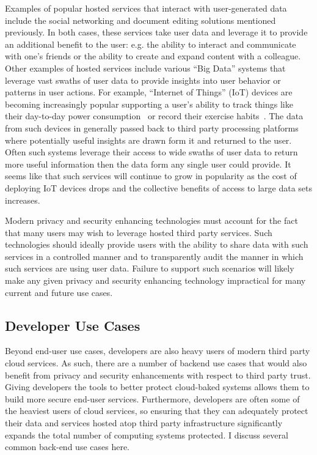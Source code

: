 Examples of popular hosted services that interact with user-generated
data include the social networking and document editing solutions
mentioned previously. In both cases, these services take user data and
leverage it to provide an additional benefit to the user: e.g. the
ability to interact and communicate with one's friends or the ability
to create and expand content with a colleague. Other examples of
hosted services include various ``Big Data'' systems that leverage
vast swaths of user data to provide insights into user behavior or
patterns in user actions. For example, ``Internet of Things'' (IoT)
devices are becoming increasingly popular supporting a user's ability
to track things like their day-to-day power consumption~\cite{neurio}
or record their exercise habits~\cite{fitbit}. The data from such
devices in generally passed back to third party processing platforms
where potentially useful insights are drawn form it and returned to
the user. Often such systems leverage their access to wide swaths of
user data to return more useful information then the data form any
single user could provide. It seems like that such services will
continue to grow in popularity as the cost of deploying IoT devices
drops and the collective benefits of access to large data sets
increases.

Modern privacy and security enhancing technologies must account for
the fact that many users may wish to leverage hosted third party
services. Such technologies should ideally provide users with the
ability to share data with such services in a controlled manner and to
transparently audit the manner in which such services are using user
data. Failure to support such scenarios will likely make any given
privacy and security enhancing technology impractical for many current
and future use cases.

\subsection{Developer Use Cases}

Beyond end-user use cases, developers are also heavy users of modern
third party cloud services. As such, there are a number of backend use
cases that would also benefit from privacy and security enhancements
with respect to third party trust. Giving developers the tools to
better protect cloud-baked systems allows them to build more secure
end-user services. Furthermore, developers are often some of the
heaviest users of cloud services, so ensuring that they can adequately
protect their data and services hosted atop third party infrastructure
significantly expands the total number of computing systems
protected. I discuss several common back-end use cases here.

